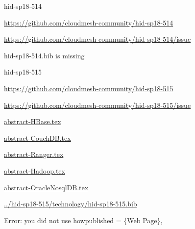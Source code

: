 \begin{IU}

hid-sp18-514

\url{https://github.com/cloudmesh-community/hid-sp18-514}

\url{https://github.com/cloudmesh-community/hid-sp18-514/issue}

hid-sp18-514.bib is missing

\end{IU}


\begin{IU}

hid-sp18-515

\url{https://github.com/cloudmesh-community/hid-sp18-515}

\url{https://github.com/cloudmesh-community/hid-sp18-515/issue}

\href{https://github.com/cloudmesh-community/hid-sp18-515/blob/master//technology/abstract-HBase.tex}{abstract-HBase.tex}

\href{https://github.com/cloudmesh-community/hid-sp18-515/blob/master//technology/abstract-CouchDB.tex}{abstract-CouchDB.tex}

\href{https://github.com/cloudmesh-community/hid-sp18-515/blob/master//technology/abstract-Ranger.tex}{abstract-Ranger.tex}

\href{https://github.com/cloudmesh-community/hid-sp18-515/blob/master//technology/abstract-Hadoop.tex}{abstract-Hadoop.tex}

\href{https://github.com/cloudmesh-community/hid-sp18-515/blob/master//technology/abstract-OracleNosqlDB.tex}{abstract-OracleNosqlDB.tex}

\href{https://github.com/cloudmesh-community/hid-sp18-515/blob/master//technology/hid-sp18-515.bib}{../hid-sp18-515/technology/hid-sp18-515.bib}

Error: you did not use howpublished = \{Web Page\},

\end{IU}


